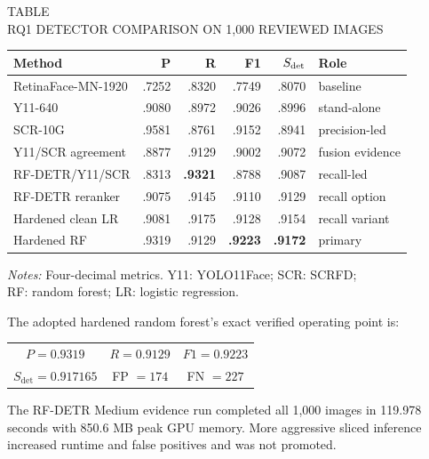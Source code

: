 \documentclass[10pt,twocolumn]{IEEEtran}
\begin{document}
\begin{center}
\begin{minipage}{\columnwidth}
\centering
{}\label{tab:rq1-detectors}
{\footnotesize TABLE~\thetable\\
RQ1 DETECTOR COMPARISON ON 1,000 REVIEWED IMAGES\par}
\vspace{4pt}
\fontsize{7.5}{9.0}\selectfont
\setlength{\tabcolsep}{2.2pt}
\renewcommand{\arraystretch}{1.15}
\begin{tabular*}{\columnwidth}{@{\extracolsep{\fill}}p{}rrrrp{}@{}}
\hline
\textbf{Method} & \textbf{P} & \textbf{R} & \textbf{F1} &
\textbf{$S_{\rm det}$} & \textbf{Role} \\
\hline
RetinaFace-MN-1920 & .7252 & .8320 & .7749 & .8070 & baseline \\
Y11-640 & .9080 & .8972 & .9026 & .8996 & stand-alone \\
SCR-10G & .9581 & .8761 & .9152 & .8941 & precision-led \\
Y11/SCR agreement & .8877 & .9129 & .9002 & .9072 & fusion evidence \\
RF-DETR/Y11/SCR & .8313 & \textbf{.9321} & .8788 & .9087 & recall-led \\
RF-DETR reranker & .9075 & .9145 & .9110 & .9129 & recall option \\
Hardened clean LR & .9081 & .9175 & .9128 & .9154 & recall variant \\
Hardened RF & .9319 & .9129 & \textbf{.9223} & \textbf{.9172} & primary \\
\hline
\end{tabular*}
\vspace{4pt}

\raggedright\footnotesize \textit{Notes:} Four-decimal metrics. Y11: YOLO11Face;
SCR: SCRFD;\\ RF: random forest; LR: logistic regression.
\par\vspace{3pt}
\end{minipage}
\end{center}

The adopted hardened random forest's exact verified operating point is:
\begin{center}
\footnotesize
\begin{tabular}{@{}ccc@{}}
$P=0.9319$ & $R=0.9129$ & $F1=0.9223$ \\
$S_{\mathrm{det}}=0.917165$ & FP $=174$ & FN $=227$
\end{tabular}
\end{center}
The RF-DETR Medium evidence run completed all 1,000
images in 119.978 seconds with 850.6 MB peak GPU memory. More aggressive sliced
inference increased runtime and false positives and was not promoted.
\end{document}
